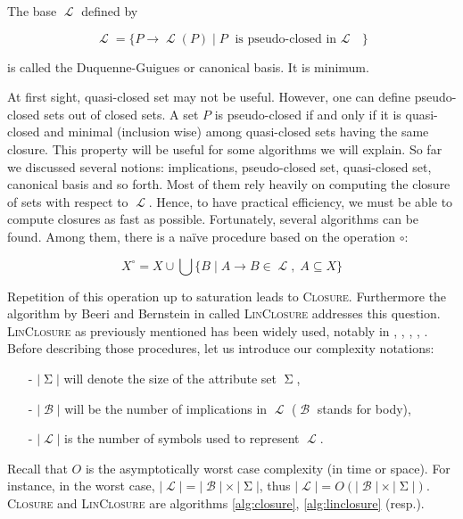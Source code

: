\documentclass[runningheads]{llncs}
\DeclareMathOperator{\I}{\mathcal{L}}  %
\DeclareMathOperator{\Sg}{\Sigma}  %
\DeclareMathOperator{\imp}{\longrightarrow} %
\DeclareMathOperator{\B}{\mathcal{B}}
\begin{document}
\begin{definition} The base $\I$ defined by
	
	\[ \I = \{ P \imp \I(P) \; | \; P \text{ is pseudo-closed in $\I$ } \} \]
	
\noindent is called the Duquenne-Guigues or canonical basis. It is minimum.
	
\end{definition}

At first sight, quasi-closed set may not be useful. However, one can define
pseudo-closed sets out of closed sets. A set $P$ is pseudo-closed if and only if it is quasi-closed and minimal (inclusion wise) among quasi-closed sets having the same closure. This property will be useful for some algorithms we will explain.
So far we discussed several notions: implications, pseudo-closed set, 
quasi-closed set, canonical basis and so forth. Most of them rely heavily on
computing the closure of sets with respect to $\I$. Hence, to have practical 
efficiency, we must be able to compute closures as fast as possible. 
Fortunately, several algorithms can be found. Among them, there is a naïve
procedure based on the operation $\circ$:

\[ X^{\circ} = 
X \cup \bigcup \{ B \; | \; A \imp B \in \I, \; A \subseteq X \} \]

Repetition of this operation up to saturation leads to \textsc{Closure}. Furthermore the algorithm by Beeri and Bernstein in \cite{beeri_computational_1979} called \textsc{LinClosure} addresses this question. \textsc{LinClosure} as previously mentioned has been widely used, notably in \cite{maier_theory_1983}, \cite{maier_minimum_1980}, \cite{ganter_conceptual_2016}, \cite{shock_computing_1986}, \cite{day_lattice_1992}. Before describing those procedures, let us introduce our complexity notations:
\begin{itemize}
	\item[-] $|\Sg|$ will denote the size of the attribute set $\Sg$,
	\item[-] $|\B|$ will be the number of implications in $\I$ ($\B$ stands
	for body),
	\item[-] $|\I|$ is the number of symbols used to represent $\I$.
\end{itemize}
Recall that $O$ is the asymptotically worst case complexity (in time or space). For instance, in the worst case, $|\I| = |\B|\times|\Sg|$, thus $|\I| = O(|\B|\times|\Sg|)$. \textsc{Closure} and \textsc{LinClosure} are algorithms \ref{alg:closure}, \ref{alg:linclosure} (resp.). 
\end{document}
